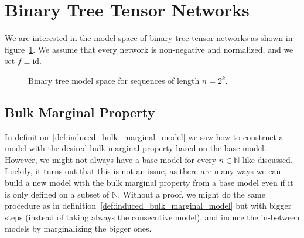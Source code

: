 \documentclass[../../main.tex]{subfiles}
\begin{document}
\section{Binary Tree Tensor Networks}
    We are interested in the model space of binary tree tensor networks as shown in figure~\ref{fig:binary_tree_tensor_network}. We assume that every network is non-negative and normalized, and we set $f \equiv \text{id}$.

    \begin{figure}[h]
        \centering
        \caption{Binary tree model space for sequences of length $n = 2^k$.}
        \label{fig:binary_tree_tensor_network}
    \end{figure}

\subsection{Bulk Marginal Property}
    In definition~\ref{def:induced_bulk_marginal_model} we saw how to construct a model with the desired bulk marginal property based on the base model. However, we might not always have a base model for every $n \in \mathbb{N}$ like discussed. Luckily, it turns out that this is not an issue, as there are many ways we can build a new model with the bulk marginal property from a base model even if it is only defined on a subset of $\mathbb{N}$. Without a proof, we might do the same procedure as in definition~\ref{def:induced_bulk_marginal_model} but with bigger steps (instead of taking always the consecutive model), and induce the in-between models by marginalizing the bigger ones.
\end{document}
